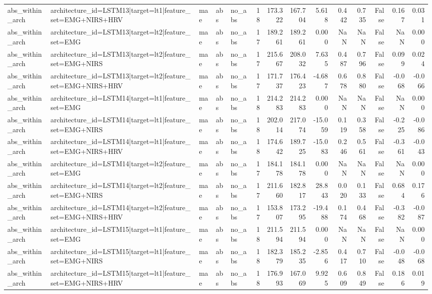 \begin{table}
\begin{tabular}{lllllrrrrrrrrr}
abs_within_arch & architecture_id=LSTM13|target=lt1|feature_set=EMG+NIRS+HRV & mae & abs & no_abs & 18 & 173.322 & 167.704 & 5.618 & 0.442 & 0.735 & False & 0.167 & 0.031 \\
abs_within_arch & architecture_id=LSTM13|target=lt2|feature_set=EMG & mae & abs & no_abs & 17 & 189.261 & 189.261 & 0.000 & NaN & NaN & False & NaN & 0.000 \\
abs_within_arch & architecture_id=LSTM13|target=lt2|feature_set=EMG+NIRS & mae & abs & no_abs & 17 & 215.667 & 208.032 & 7.635 & 0.487 & 0.796 & False & 0.099 & 0.024 \\
abs_within_arch & architecture_id=LSTM13|target=lt2|feature_set=EMG+NIRS+HRV & mae & abs & no_abs & 17 & 171.737 & 176.423 & -4.687 & 0.678 & 0.880 & False & -0.068 & -0.066 \\
abs_within_arch & architecture_id=LSTM14|target=lt1|feature_set=EMG & mae & abs & no_abs & 18 & 214.283 & 214.283 & 0.000 & NaN & NaN & False & NaN & 0.000 \\
abs_within_arch & architecture_id=LSTM14|target=lt1|feature_set=EMG+NIRS & mae & abs & no_abs & 18 & 202.014 & 217.074 & -15.059 & 0.119 & 0.358 & False & -0.225 & -0.086 \\
abs_within_arch & architecture_id=LSTM14|target=lt1|feature_set=EMG+NIRS+HRV & mae & abs & no_abs & 18 & 174.642 & 189.725 & -15.083 & 0.246 & 0.561 & False & -0.361 & -0.043 \\
abs_within_arch & architecture_id=LSTM14|target=lt2|feature_set=EMG & mae & abs & no_abs & 17 & 184.178 & 184.178 & 0.000 & NaN & NaN & False & NaN & 0.000 \\
abs_within_arch & architecture_id=LSTM14|target=lt2|feature_set=EMG+NIRS & mae & abs & no_abs & 17 & 211.660 & 182.817 & 28.843 & 0.020 & 0.133 & False & 0.684 & 0.176 \\
abs_within_arch & architecture_id=LSTM14|target=lt2|feature_set=EMG+NIRS+HRV & mae & abs & no_abs & 17 & 153.807 & 173.295 & -19.488 & 0.174 & 0.468 & False & -0.382 & -0.087 \\
abs_within_arch & architecture_id=LSTM15|target=lt1|feature_set=EMG & mae & abs & no_abs & 18 & 211.594 & 211.594 & 0.000 & NaN & NaN & False & NaN & 0.000 \\
abs_within_arch & architecture_id=LSTM15|target=lt1|feature_set=EMG+NIRS & mae & abs & no_abs & 18 & 182.379 & 185.235 & -2.856 & 0.417 & 0.710 & False & -0.048 & -0.068 \\
abs_within_arch & architecture_id=LSTM15|target=lt1|feature_set=EMG+NIRS+HRV & mae & abs & no_abs & 18 & 176.993 & 167.069 & 9.925 & 0.609 & 0.849 & False & 0.186 & 0.019 \\

\end{tabular}
\end{table}
